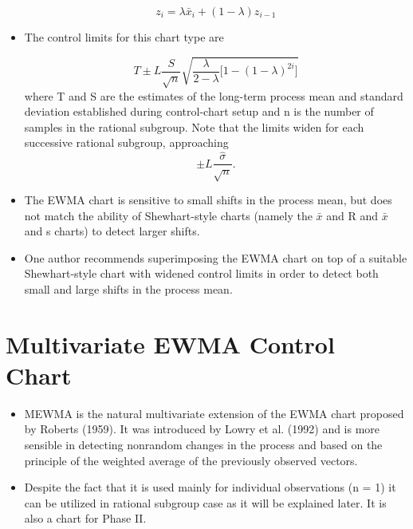 \documentclass[11pt]{article} %
\begin{document}
\begin{itemize}
\[z_i = \lambda \bar x_i + \left ( 1 - \lambda \right)z_{i - 1}\]
\item The control limits for this chart type are 

\[T \pm L\frac {S}{\sqrt n}\sqrt{\frac{\lambda}{2 - \lambda}\lbrack 1 - \left ( 1 - \lambda \right )^{2i} \rbrack}\] where T and S are the estimates of the long-term process mean and standard deviation established during control-chart setup and n is the number of samples in the rational subgroup. Note that the limits widen for each successive rational subgroup, approaching \[ \pm L\frac {\hat \sigma}{\sqrt n}.\]

\item The EWMA chart is sensitive to small shifts in the process mean, but does not match the ability of Shewhart-style charts (namely the $\bar{x}$ and R and $\bar{x}$ and s charts) to detect larger shifts.
\item One author recommends superimposing the EWMA chart on top of a suitable Shewhart-style chart with widened control limits in order to detect both small and large shifts in the process mean.
\end{itemize}
\newpage
\section{Multivariate EWMA Control Chart}
\begin{itemize}
\item MEWMA is the natural multivariate extension of the EWMA chart proposed by
Roberts (1959). It was introduced by Lowry et al. (1992) and is more sensible in
detecting nonrandom changes in the process and based on the principle of the
weighted average of the previously observed vectors.
\item
Despite the fact that it is used mainly for individual observations (n = 1) it can
be utilized in rational subgroup case as it will be explained later. It is also a chart for
Phase II.
\end{itemize}
\end{document}
